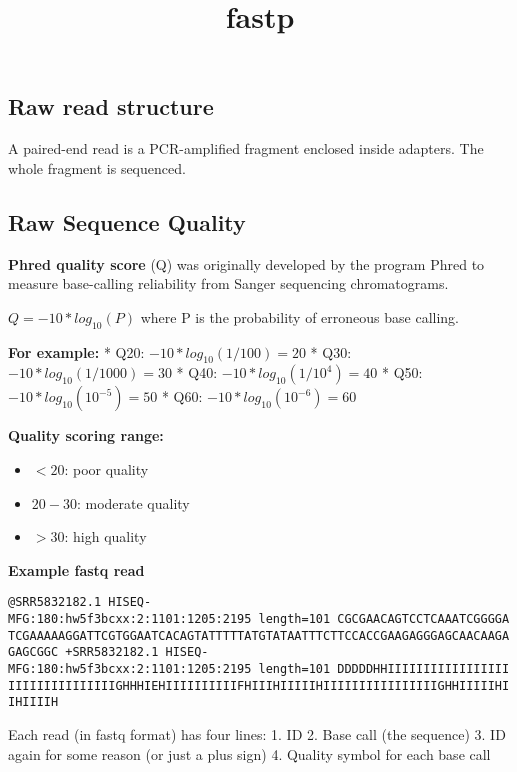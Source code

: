 \documentclass[11pt]{article}
\title{fastp}
\providecommand{\tightlist}{%
      \setlength{\itemsep}{0pt}\setlength{\parskip}{0pt}}
\begin{document}
    
    \maketitle
    
    

    
    \hypertarget{raw-read-structure}{%
\subsection{Raw read structure}\label{raw-read-structure}}

A paired-end read is a PCR-amplified fragment enclosed inside adapters.
The whole fragment is sequenced.

\hypertarget{raw-sequence-quality}{%
\subsection{Raw Sequence Quality}\label{raw-sequence-quality}}

\textbf{Phred quality score} (Q) was originally developed by the program
Phred to measure base-calling reliability from Sanger sequencing
chromatograms.

\(Q = -10 * log_{10}(P)\) where P is the probability of erroneous base
calling.

\textbf{For example:} * Q20: \(-10 * log_{10}(1/100) = 20\) * Q30:
\(-10 * log_{10}(1/1000) = 30\) * Q40: \(-10 * log_{10}(1/10^4) = 40\) *
Q50: \(-10 * log_{10}(10^{-5}) = 50\) * Q60:
\(-10 * log_{10}(10^{-6}) = 60\)

\textbf{Quality scoring range:}

\begin{itemize}
\tightlist
\item
  \(< 20\): poor quality
\item
  \(20 - 30\): moderate quality
\item
  \(> 30\): high quality
\end{itemize}

\textbf{Example fastq read}

\texttt{@SRR5832182.1\ HISEQ-MFG:180:hw5f3bcxx:2:1101:1205:2195\ length=101\ CGCGAACAGTCCTCAAATCGGGGATCGAAAAAGGATTCGTGGAATCACAGTATTTTTATGTATAATTTCTTCCACCGAAGAGGGAGCAACAAGAGAGCGGC\ +SRR5832182.1\ HISEQ-MFG:180:hw5f3bcxx:2:1101:1205:2195\ length=101\ DDDDDHHIIIIIIIIIIIIIIIIIIIIIIIIIIIIIIIIGHHHIEHIIIIIIIIIIFHIIIHIIIIIHIIIIIIIIIIIIIIIIGHHIIIIIHIIHIIIIH}

Each read (in fastq format) has four lines: 1. ID 2. Base call (the
sequence) 3. ID again for some reason (or just a plus sign) 4. Quality
symbol for each base call
\end{document}
